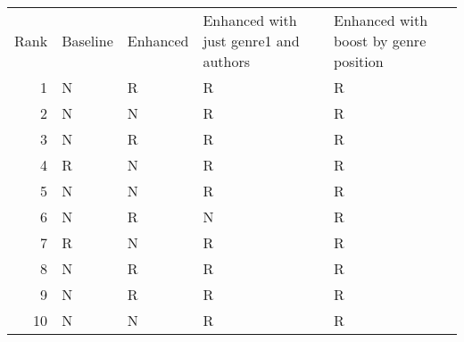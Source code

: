 \begin{tabular}{rllll}
Rank & Baseline & Enhanced & Enhanced with just genre1 and authors & Enhanced with boost by genre position \\
1 & N & R & R & R \\
2 & N & N & R & R \\
3 & N & R & R & R \\
4 & R & N & R & R \\
5 & N & N & R & R \\
6 & N & R & N & R \\
7 & R & N & R & R \\
8 & N & R & R & R \\
9 & N & R & R & R \\
10 & N & N & R & R \\
\end{tabular}
